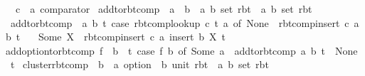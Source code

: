 \begin{isabellebody}
\ \ \ c\ {\isacharcolon}{\kern0pt}{\isacharcolon}{\kern0pt}\ {\isachardoublequoteopen}{\isacharprime}{\kern0pt}a\ comparator{\isachardoublequoteclose}\isanewline
{}\isanewline
\isanewline
{}\isamarkupfalse%
\ add{\isacharunderscore}{\kern0pt}to{\isacharunderscore}{\kern0pt}rbt{\isacharunderscore}{\kern0pt}comp\ {\isacharcolon}{\kern0pt}{\isacharcolon}{\kern0pt}\ {\isachardoublequoteopen}{\isacharprime}{\kern0pt}a\ {\isasymtimes}\ {\isacharprime}{\kern0pt}b\ {\isasymRightarrow}\ {\isacharparenleft}{\kern0pt}{\isacharprime}{\kern0pt}a{\isacharcomma}{\kern0pt}\ {\isacharprime}{\kern0pt}b\ set{\isacharparenright}{\kern0pt}\ rbt\ {\isasymRightarrow}\ {\isacharparenleft}{\kern0pt}{\isacharprime}{\kern0pt}a{\isacharcomma}{\kern0pt}\ {\isacharprime}{\kern0pt}b\ set{\isacharparenright}{\kern0pt}\ rbt{\isachardoublequoteclose}\ \isanewline
\ \ {\isachardoublequoteopen}add{\isacharunderscore}{\kern0pt}to{\isacharunderscore}{\kern0pt}rbt{\isacharunderscore}{\kern0pt}comp\ {\isacharequal}{\kern0pt}\ {\isacharparenleft}{\kern0pt}{\isasymlambda}{\isacharparenleft}{\kern0pt}a{\isacharcomma}{\kern0pt}\ b{\isacharparenright}{\kern0pt}\ t{\isachardot}{\kern0pt}\ case\ rbt{\isacharunderscore}{\kern0pt}comp{\isacharunderscore}{\kern0pt}lookup\ c\ t\ a\ of\ None\ {\isasymRightarrow}\ rbt{\isacharunderscore}{\kern0pt}comp{\isacharunderscore}{\kern0pt}insert\ c\ a\ {\isacharbraceleft}{\kern0pt}b{\isacharbraceright}{\kern0pt}\ t\isanewline
\ \ {\isacharbar}{\kern0pt}\ Some\ X\ {\isasymRightarrow}\ rbt{\isacharunderscore}{\kern0pt}comp{\isacharunderscore}{\kern0pt}insert\ c\ a\ {\isacharparenleft}{\kern0pt}insert\ b\ X{\isacharparenright}{\kern0pt}\ t{\isacharparenright}{\kern0pt}{\isachardoublequoteclose}\isanewline
\isanewline
{}\isamarkupfalse%
\ {\isachardoublequoteopen}add{\isacharunderscore}{\kern0pt}option{\isacharunderscore}{\kern0pt}to{\isacharunderscore}{\kern0pt}rbt{\isacharunderscore}{\kern0pt}comp\ f\ {\isasymequiv}\ {\isacharparenleft}{\kern0pt}{\isasymlambda}b\ {\isacharunderscore}{\kern0pt}\ t{\isachardot}{\kern0pt}\ case\ f\ b\ of\ Some\ a\ {\isasymRightarrow}\ add{\isacharunderscore}{\kern0pt}to{\isacharunderscore}{\kern0pt}rbt{\isacharunderscore}{\kern0pt}comp\ {\isacharparenleft}{\kern0pt}a{\isacharcomma}{\kern0pt}\ b{\isacharparenright}{\kern0pt}\ t\ {\isacharbar}{\kern0pt}\ None\ {\isasymRightarrow}\ t{\isacharparenright}{\kern0pt}{\isachardoublequoteclose}\isanewline
\isanewline
{}\isamarkupfalse%
\ cluster{\isacharunderscore}{\kern0pt}rbt{\isacharunderscore}{\kern0pt}comp\ {\isacharcolon}{\kern0pt}{\isacharcolon}{\kern0pt}\ {\isachardoublequoteopen}{\isacharparenleft}{\kern0pt}{\isacharprime}{\kern0pt}b\ {\isasymRightarrow}\ {\isacharprime}{\kern0pt}a\ option{\isacharparenright}{\kern0pt}\ {\isasymRightarrow}\ {\isacharparenleft}{\kern0pt}{\isacharprime}{\kern0pt}b{\isacharcomma}{\kern0pt}\ unit{\isacharparenright}{\kern0pt}\ rbt\ {\isasymRightarrow}\ {\isacharparenleft}{\kern0pt}{\isacharprime}{\kern0pt}a{\isacharcomma}{\kern0pt}\ {\isacharprime}{\kern0pt}b\ set{\isacharparenright}{\kern0pt}\ rbt{\isachardoublequoteclose}\ \isanewline

\end{isabellebody}
